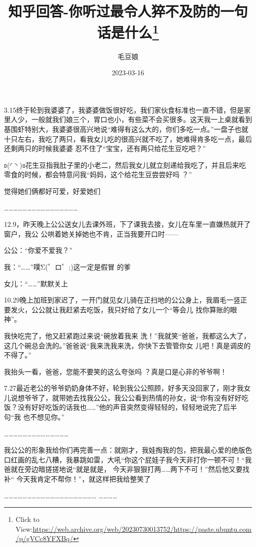 \documentclass{article}
\title{知乎回答-你听过最令人猝不及防的一句话是什么\footnote{Click to View:\url{https://web.archive.org/web/20230730013752/https://paste.ubuntu.com/p/gVCc8YFXBq/}}}
\author{毛豆娘}
\date{2023-03-16}
\begin{document}

\maketitle


\Large

﻿3.15终于轮到我婆婆了，我婆婆做饭很好吃，我们家伙食标准也一直不错，但是家里人少，一般就我们娘三个，胃口也小，有些菜不会买很多。这天我一上桌就看到基围虾特别大，我婆婆很高兴地说“难得有这么大的，你们多吃一点。”一盘子也就十只左右，我吃了两只，看我女儿吃的很高兴就不吃了，她难得肯多吃一点，最后还剩两只的时候我婆婆
忍不住了“宝宝，还有两只给花生豆吃吧？” 

ʚ(◜ ◝ )ɞ花生豆指我肚子里的小老二，然后我女儿就立刻递给我吃了，并且后来吃零食的时候，都会特意问我“妈妈，这个给花生豆尝尝好吗
？” 


\newpage

觉得她们俩都好可爱，好爱她们 


………………………………………… 

12.9，昨天晚上公公送女儿去课外班，下了课我去接，女儿在车里一直嫌热就开了窗户，我公
公哄着她关掉她也不肯，正当我要开口时—— 


公公：“你爱不爱我？” 

我：“……”噗Σ(゜ロ゜;)这一定是假冒
的爹 


女儿：“……”默默关上 


10.29晚上加班到家迟了，一开门就见女儿骑在正扫地的公公身上，我眉毛一竖正要发火，公公就让我赶紧去吃饭，我只好给了女儿一个“等会儿
找你算账的眼神”。 

我快吃完了，他又赶紧跑过来说“碗放着我来
\newpage
洗！”我就笑“爸爸，我都这么大了，这几个碗总会洗的。”爸爸说“我来洗我来洗，你快下去管管你女
儿吧！真是调皮的不得了。” 

我抬头一看，爸爸，您能不要笑的这么夸张吗
？真是口是心非的爷爷啊！ 


7.27最近老公的爷爷奶奶身体不好，轮到我公公照顾，好多天没回家了，刚才我女儿说想爷爷了，就带她去找我公公，我公公看到热情的孙女，说“你有没有好好吃饭？没有好好吃饭的话我也……”他的声音突然变得轻轻的，轻轻地说完了后半句“我
也不想见你。” 


…………………………………… 

我公公的形象我给你们再完善一点：就刚才，我娃掏我的包，把我最心爱的绝版色口红画的乱七八糟，我暴跳如雷，大吼“你这个屁娃子我今天非打你一顿不可！“我爸就在旁边暗搓搓地说“就是就是，
\newpage
今天非狠狠打两……两下不可！”然后他又要找补“
今天我肯定不帮你！”，就这样把我给整笑了 

……………………………………………………
………… 
\end{document}
